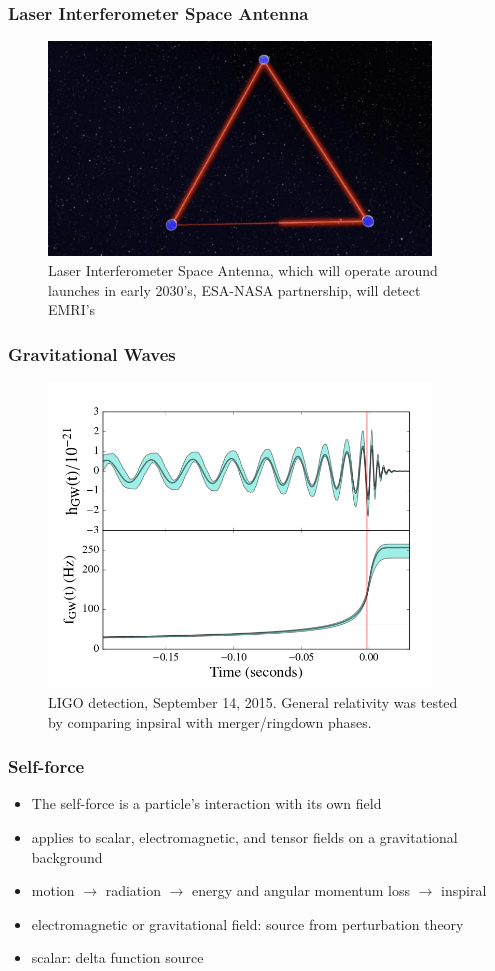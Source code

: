 \documentclass{beamer}
\begin{document}
\begin{frame}
  \frametitle{Laser Interferometer Space Antenna}
  \begin{figure}
    \includegraphics[width=4.0in]{eLISA}
    \caption{Laser Interferometer Space Antenna, which will operate around launches in early 2030's, ESA-NASA partnership, will detect EMRI's}
  \end{figure}
\end{frame}


\begin{frame}
  \frametitle{Gravitational Waves}
  \begin{figure}
    \includegraphics[width=4.0in]{LIGOGRtest.png}
    \caption{LIGO detection, September 14, 2015. General relativity was tested by comparing inpsiral with merger/ringdown phases.}
  \end{figure}
\end{frame}

\begin{frame}
  \frametitle{Self-force}
  \begin{itemize}
  \item The self-force is a particle's interaction with its own field
  \item applies to scalar, electromagnetic, and tensor fields on a gravitational background
  \item motion $\rightarrow$ radiation $\rightarrow$ energy and angular momentum loss $\rightarrow$ inspiral
  \item electromagnetic or gravitational field: source from perturbation theory
  \item scalar: delta function source
  \end{itemize}
\end{frame}
\end{document}
